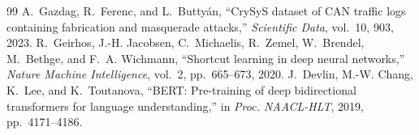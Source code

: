 \documentclass[conference]{IEEEtran}
\begin{document}
\begin{thebibliography}{99}
 A.~Gazdag, R.~Ferenc, and L.~Butty\'an, ``CrySyS dataset of CAN traffic logs containing fabrication and masquerade attacks,'' \emph{Scientific Data}, vol.~10, 903, 2023.
 R.~Geirhos, J.-H. Jacobsen, C.~Michaelis, R.~Zemel, W.~Brendel, M.~Bethge, and F.~A. Wichmann, ``Shortcut learning in deep neural networks,'' \emph{Nature Machine Intelligence}, vol.~2, pp.~665--673, 2020.
 J.~Devlin, M.-W. Chang, K.~Lee, and K.~Toutanova, ``BERT: Pre-training of deep bidirectional transformers for language understanding,'' in \emph{Proc. NAACL-HLT}, 2019, pp.~4171--4186.
\end{thebibliography}
\end{document}
